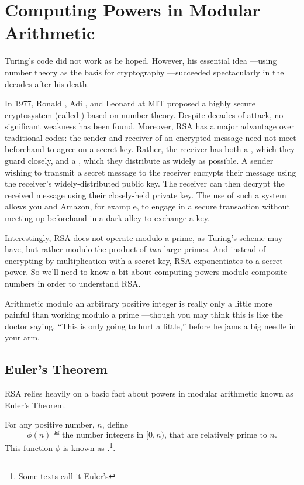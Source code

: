 \section{Computing Powers in Modular Arithmetic}%

Turing's code did not work as he hoped.  However, his essential idea ---using number theory
as the basis for cryptography ---succeeded spectacularly in the decades after his death.

In 1977, Ronald , Adi , and Leonard  at MIT proposed a
highly secure cryptosystem (called \textbf{}) based on number theory.  Despite
decades of attack, no significant weakness has been found.  Moreover, RSA has a major
advantage over traditional codes: the sender and receiver of an encrypted message need not
meet beforehand to agree on a secret key.  Rather, the receiver has both a , which they guard closely, and a , which they distribute as widely
as possible.  A sender wishing to transmit a secret message to the receiver encrypts their
message using the receiver's widely-distributed public key.  The receiver can then decrypt
the received message using their closely-held private key.  The use of such a  system allows you and Amazon, for example, to engage in a secure
transaction without meeting up beforehand in a dark alley to exchange a key.

Interestingly, RSA does not operate modulo a prime, as Turing's scheme
may have, but rather modulo the product of \emph{two} large primes.
And instead of encrypting by multiplication with a secret key, RSA
exponentiates to a secret power.  So we'll need to know a bit 
about computing powers modulo composite numbers in order to understand RSA.
\begin{editingnotes}
Arithmetic modulo an arbitrary positive integer is really only a
little more painful than working modulo a prime ---though you may
think this is like the doctor saying, ``This is only going to hurt a
little,'' before he jams a big needle in your arm.
\end{editingnotes}

\subsection{Euler's Theorem}\label{Euler_sec}

RSA relies heavily on a basic fact about powers in modular arithmetic
known as Euler's Theorem.
\begin{definition}
For any positive number, $n$, define
\[
\phi(n) \eqdef \text{the number integers in $[0, n)$, that are relatively prime
  to~$n$.}
\]
This function $\phi$ is known as .\footnote{Some texts call it Euler's }.
\end{definition}

